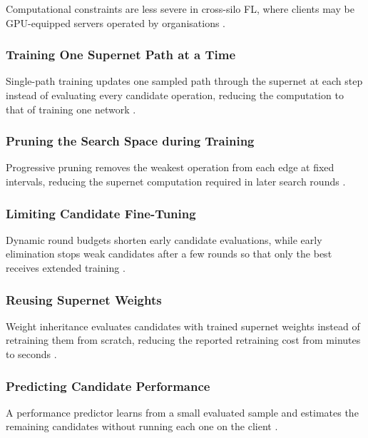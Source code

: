 Computational constraints are less severe in cross-silo FL, where clients may be GPU-equipped servers operated by organisations \cite{fednas_over_hetero_mobile_devices_2022,fednas_2021}.

\subsubsection{Training One Supernet Path at a Time}

Single-path training updates one sampled path through the supernet at each step instead of evaluating every candidate operation, reducing the computation to that of training one network \cite{dfnas_2020}.

\subsubsection{Pruning the Search Space during Training}

Progressive pruning removes the weakest operation from each edge at fixed intervals, reducing the supernet computation required in later search rounds \cite{peaches_2024}.

\subsubsection{Limiting Candidate Fine-Tuning}

Dynamic round budgets shorten early candidate evaluations, while early elimination stops weak candidates after a few rounds so that only the best receives extended training \cite{fednas_over_hetero_mobile_devices_2022}.

\subsubsection{Reusing Supernet Weights}

Weight inheritance evaluates candidates with trained supernet weights instead of retraining them from scratch, reducing the reported retraining cost from minutes to seconds \cite{medical_image_segmentation_fednas_2024}.

\subsubsection{Predicting Candidate Performance}

A performance predictor learns from a small evaluated sample and estimates the remaining candidates without running each one on the client \cite{hapfnas_2025}.


